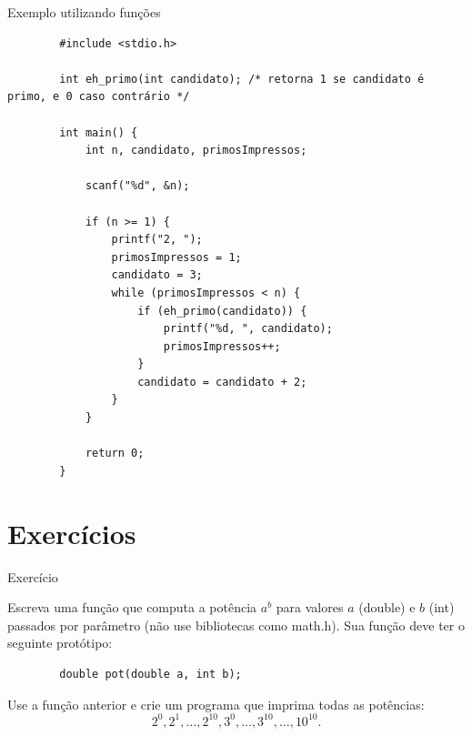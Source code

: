 \documentclass[handout]{beamer}
\begin{document}
\begin{frame}[fragile]{Exemplo utilizando funções}

    \begin{verbatim}
        #include <stdio.h>
        
        int eh_primo(int candidato); /* retorna 1 se candidato é primo, e 0 caso contrário */

        int main() {
            int n, candidato, primosImpressos;

            scanf("%d", &n);

            if (n >= 1) {
                printf("2, ");
                primosImpressos = 1;
                candidato = 3;
                while (primosImpressos < n) {
                    if (eh_primo(candidato)) {
                        printf("%d, ", candidato);
                        primosImpressos++;
                    }
                    candidato = candidato + 2;
                }
            }

            return 0;
        }
    \end{verbatim}
\end{frame}


\section{Exercícios}

\begin{frame}[fragile]{Exercício}

    Escreva uma função que computa a potência $a^b$ para valores $a$ (double) e $b$ (int) passados por parâmetro (não use bibliotecas como math.h).
    Sua função deve ter o seguinte protótipo:

    \begin{verbatim}
        double pot(double a, int b);
    \end{verbatim}

    Use a função anterior e crie um programa que imprima todas as potências: $$2^0, 2^1, \ldots, 2^{10}, 3^0, \ldots, 3^{10}, \ldots, 10^{10}.$$
\end{frame}
\end{document}

